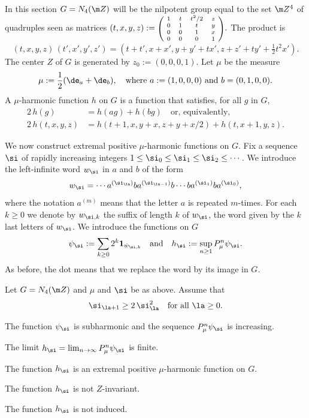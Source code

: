 In this section $G=N_4(\m Z)$ will be the nilpotent group equal to the set $\m Z^4$
of quadruples seen as matrices
$(t,x,y,z):=\mbox{\scriptsize $\left(\!
\begin{array}{cccc} 1 &t&t^2/2&z \\
0 &1&t&y\\0&0&1&x\\0&0&0&1
\end{array}\!\right)$}.$ The product is
\begin{equation*}
\label{eqnprofour}
(t,x,y,z)\, (t',x',y',z')= (t+t',x+x',y+y'+tx',z+z'+ty'+\tfrac12 t^2x').
\end{equation*}
The center $Z$ of $G$ is generated by $z_0:=(0,0,0,1)$.
Let $\mu$ be the measure
\begin{equation*}
\label{eqnmu0}
\mu:=\frac12(\de_{a}+\de_{b}),
\quad\text{where $a:=(1,0,0,0)$ and $b=(0,1,0,0)$.}
\end{equation*}
A $\mu$-harmonic function $h$ on $G$ is a function that satisfies, for all $g$ in $G$,
\begin{align*}
\label{eqnhghaghbg}
2\,h(g)&= h(ag)+ h(bg)
\quad\text{or, equivalently,}\\
2\,h(t,x,y,z)&= h(t\!+\!1,x,y+x,z\!+\!y\!+\! x/2)+ h(t,x\!+\!1,y,z).
\end{align*}

We now construct
extremal positive $\mu$-harmonic functions on $G$. Fix a sequence $\si$ of rapidly increasing integers $1\leq \si_0\leq \si_1\leq \si_2\leq\cdots$.
We introduce the left-infinite word $w_\si$ in $a$ and $b$ of the form
\[
w_\si = \cdots a^{(\si_{\la})}ba^{(\si_{\la-1})}b\cdots ba^{(\si_1)}ba^{(\si_0)},
\]
where the notation $a^{(m)}$ means that the letter $a$ is repeated $m$-times.
For each $k\geq 0$ we denote by $w_{\si,k}$ the suffix of length $k$ of $w_\si$,
\ie the word given by the $k$ last letters of $w_\si$.
We introduce the functions on $G$
\[
\psi_\si:=\sum_{k\geq 0}2^k\mathbf{1}_{\dot{w}_{\si,k}}
\quad\text{and}\quad
h_\si:=\sup_{n\geq 1}P_\mu^n\psi_\si.
\]
As before, the dot means that we replace the word by its image in $G$.

\begin{Lem}
\label{lemnilpfour}
Let $G=N_4(\m Z)$ and $\mu$ and $\si$ be as above. Assume that
\begin{equation}
\label{eqnsilaincrease}
\si_{\la+1}\geq 2\, \si_{\la}^2
\quad\text{for all $\la\geq 0$}.
\end{equation}
\begin{enumeratea}
\item\label{lemnilpfoura}
The function $\psi_\si$ is subharmonic and the sequence $P_\mu^n\psi_\si$ is increasing.
\item\label{lemnilpfourb}
The limit $h_\si=\lim_{n\to \infty}P_\mu^n\psi_\si$ is finite.
\item\label{lemnilpfourc}
The function $h_\si$ is an extremal positive $\mu$-harmonic function on $G$.
\item\label{lemnilpfourd}
The function $h_\si$ is not $Z$-invariant.
\item\label{lemnilpfoure}
The function $h_\si$ is not induced.
\end{enumeratea}
\end{Lem}

